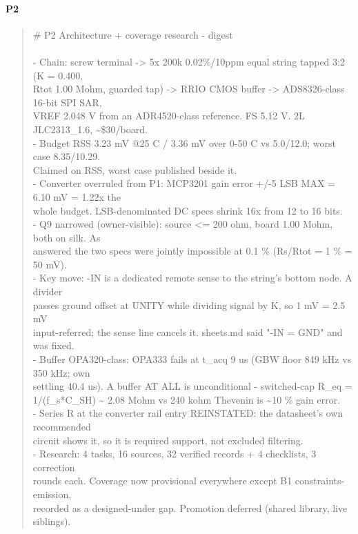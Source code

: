 \documentclass[11pt,a4paper]{article}
\begin{document}
\paragraph*{P2}
\begin{quote}\small\ttfamily\raggedright
\# P2 Architecture + coverage research - digest\\
~\\
- Chain: screw terminal -\textgreater{} 5x 200k 0.02\%/10ppm equal string tapped 3:2 (K = 0.400,\\
  Rtot 1.00 Mohm, guarded tap) -\textgreater{} RRIO CMOS buffer -\textgreater{} ADS8326-class 16-bit SPI SAR,\\
  VREF 2.048 V from an ADR4520-class reference. FS 5.12 V. 2L JLC2313\_1.6, \textasciitilde{}\$30/board.\\
- Budget RSS 3.23 mV @25 C / 3.36 mV over 0-50 C vs 5.0/12.0; worst case 8.35/10.29.\\
  Claimed on RSS, worst case published beside it.\\
- Converter overruled from P1: MCP3201 gain error +/-5 LSB MAX = 6.10 mV = 1.22x the\\
  whole budget. LSB-denominated DC specs shrink 16x from 12 to 16 bits.\\
- Q9 narrowed (owner-visible): source \textless{}= 200 ohm, board 1.00 Mohm, both on silk. As\\
  answered the two specs were jointly impossible at 0.1 \% (Rs/Rtot = 1 \% = 50 mV).\\
- Key move: -IN is a dedicated remote sense to the string's bottom node. A divider\\
  passes ground offset at UNITY while dividing signal by K, so 1 mV = 2.5 mV\\
  input-referred; the sense line cancels it. sheets.md said "-IN = GND" and was fixed.\\
- Buffer OPA320-class: OPA333 fails at t\_acq 9 us (GBW floor 849 kHz vs 350 kHz; own\\
  settling 40.4 us). A buffer AT ALL is unconditional - switched-cap R\_eq =\\
  1/(f\_s{*}C\_SH) \textasciitilde{} 2.08 Mohm vs 240 kohm Thevenin is \textasciitilde{}10 \% gain error.\\
- Series R at the converter rail entry REINSTATED: the datasheet's own recommended\\
  circuit shows it, so it is required support, not excluded filtering.\\
- Research: 4 tasks, 16 sources, 32 verified records + 4 checklists, 3 correction\\
  rounds each. Coverage now provisional everywhere except B1 constraints-emission,\\
  recorded as a designed-under gap. Promotion deferred (shared library, live siblings).
\end{quote}
\end{document}
